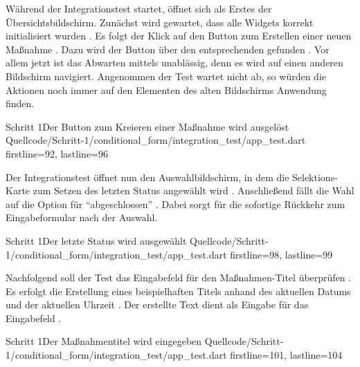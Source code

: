 Während der Integrationstest startet, öffnet sich als Erstes der Übersichtsbildschirm.
Zunächst wird gewartet, dass alle Widgets korrekt initialisiert wurden .
Es folgt der Klick auf den Button zum Erstellen einer neuen Maßnahme .
Dazu wird der Button über den entsprechenden  gefunden .
Vor allem jetzt ist das Abwarten mittels   unablässig, denn es wird auf einen anderen Bildschirm navigiert.
Angenommen der Test wartet nicht ab, so würden die Aktionen noch immer auf den Elementen des alten Bildschirms Anwendung finden. 

\begin{alexlisting}{Schritt 1}{Der Button zum Kreieren einer Maßnahme wird ausgelöst}
  {Quellcode/Schritt-1/conditional_form/integration_test/app_test.dart}
  {firstline=92, lastline=96}
  \label{lst:Schritt1ButtonKreierenMassnahmeAusgeloest}
\end{alexlisting}

Der Integrationstest öffnet nun den Auswahlbildschirm, in dem die Selektions-Karte zum Setzen des letzten Status angewählt wird .
Anschließend fällt die Wahl auf die Option für \enquote{abgeschlossen} .
Dabei sorgt  für die sofortige Rückkehr zum Eingabeformular nach der Auswahl.
 
\begin{alexlisting}{Schritt 1}{Der letzte Status wird ausgewählt}
  {Quellcode/Schritt-1/conditional_form/integration_test/app_test.dart}
  {firstline=98, lastline=99}
  \label{lst:Schritt1LetzterStatusWirdAusgewählt}
\end{alexlisting}

Nachfolgend soll der Test das Eingabefeld für den Maßnahmen-Titel überprüfen \Lst{\ref{lst:Schritt1MassnahmentitelWirdEingegeben}}.
Es erfolgt die Erstellung eines beispielhaften Titels anhand des aktuellen Datums und der aktuellen Uhrzeit .
Der erstellte Text dient als Eingabe für das Eingabefeld . 

\begin{alexlisting}{Schritt 1}{Der Maßnahmentitel wird eingegeben}
  {Quellcode/Schritt-1/conditional_form/integration_test/app_test.dart}
  {firstline=101, lastline=104}
  \label{lst:Schritt1MassnahmentitelWirdEingegeben}
\end{alexlisting}

